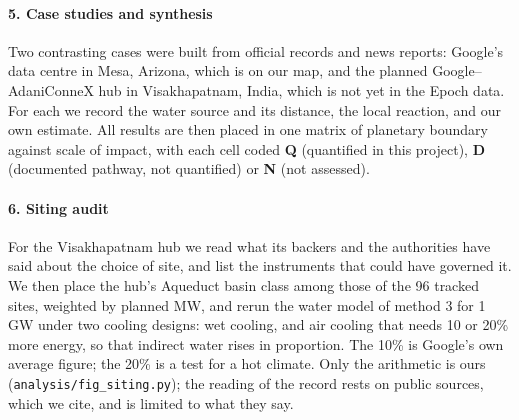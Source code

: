 \paragraph{5. Case studies and synthesis} Two contrasting cases were built from official records and news reports:
Google's data centre in Mesa, Arizona, which is on our map, and the planned Google--AdaniConneX hub in Visakhapatnam,
India, which is not yet in the Epoch data. For each we record the water source and its distance, the local reaction,
and our own estimate. All results are then placed in one matrix of planetary boundary against scale of impact, with each
cell coded \textbf{Q} (quantified in this project), \textbf{D} (documented pathway, not quantified) or \textbf{N} (not
assessed).

\paragraph{6. Siting audit} For the Visakhapatnam hub we read what its backers and the authorities have said about the choice
of site, and list the instruments that could have governed it. We then place the hub's Aqueduct basin class among those of the 96
tracked sites, weighted by planned MW, and rerun the water model of method 3 for 1\,GW under two cooling designs: wet cooling,
and air cooling that needs 10 or 20\% more energy, so that indirect water rises in proportion. The 10\% is Google's own average
figure; the 20\% is a test for a hot climate. Only the arithmetic is ours (\texttt{analysis/fig\_siting.py}); the reading of the record
rests on public sources, which we cite, and is limited to what they say.
